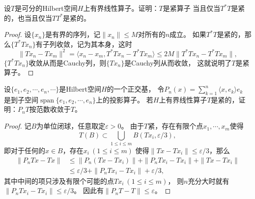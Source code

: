 \begin{7}
    设$T$是可分的Hilbert空间$H$上有界线性算子。证明：$T$是紧算子
    当且仅当$T^*T$是紧的，也当且仅当$TT^*$是紧的。
\end{7}
\begin{proof}
    设$\{x_n\}$是有界的序列，记$\|x_n\| \leqslant M$对所有的$n$成立。
    如果$T^*T$是紧的，那么$\{T^*Tx_n\}$有子列收敛，记为其本身，这时
    \[\|Tx_n-Tx_m\|^2=\langle x_n-x_m,T^*Tx_n-T^*Tx_m\rangle
    \leqslant2M\|T^*Tx_n-T^*Tx_m\|,\]
    $\{T^*Tx_n\}$收敛从而是Cauchy列，则$\{Tx_n\}$是Cauchy列从而收敛，
    这就说明了$T$是紧算子。
\end{proof}

\begin{8}
    设$\{e_1,e_2,\cdots,e_n,\cdots\}$是Hilbert空间$H$的一个正交基，
    令$P_n(x)=\sum\limits_{k=1}^n\langle x,e_k \rangle e_k$
    是到子空间$\operatorname{span}\{e_1,e_2,\cdots,e_n\}$上的投影算子。
    若$H$上有界线性算子$T$是紧的，证明：$P_nT$按范数收敛于$T$。
\end{8}
\begin{proof}
    记$B$为单位闭球，任意取定$\varepsilon>0$。
    由于$T$紧，存在有限个点$x_1,\cdots,x_m$使得
    \[T(B)\subset\bigcup_{1\leqslant i\leqslant m}B(Tx_i,\varepsilon/3),\]
    即对于任何的$x \in B$，存在$x_i\ (1\leqslant i\leqslant m)$
    使得$\|Tx-Tx_i\|\leqslant\varepsilon/3$，那么
    \begin{align*}
        \|P_nTx-Tx\|&\leqslant\|P_n(Tx-Tx_i)\|+\|P_nTx_i-Tx_i\|+\|Tx-Tx_i\|\\
        &\leqslant\varepsilon/3+\|P_nTx_i-Tx_i\|+\varepsilon/3,
    \end{align*}
    其中中间的项只涉及有限个可能的点$Tx_i\ (1\leqslant i\leqslant m)$，
    则$n$充分大时就有$\|P_nTx_i-Tx_i\|\leqslant\varepsilon/3$。
    因此有$\|P_nT-T\|\leqslant\varepsilon$。
\end{proof}

